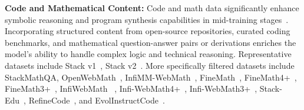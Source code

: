 


\noindent\textbf{Code and Mathematical Content:}
Code and math data significantly enhance symbolic reasoning and program synthesis capabilities in mid-training stages~\cite{gunter2024apple, allal2025smollm2, Zhang2024MAPNeoHC, hu2024minicpm, chen2025minimax, yang2025qwen3, yang2025qwen3}.
Incorporating structured content from open-source repositories, curated coding benchmarks, and mathematical question-answer pairs or derivations enriches the model's ability to handle complex logic and technical reasoning.
Representative datasets include Stack v1~\cite{Kocetkov2022TheStack}, Stack v2~\cite{lozhkov2024starcoder}. More specifically filtered datasets include StackMathQA, OpenWebMath~\cite{paster2023openwebmath}, InfiMM-WebMath~\cite{han2024infimm}, FineMath~\cite{hu2024minicpm}, FineMath4+~\cite{hu2024minicpm}, FineMath3+~\cite{hu2024minicpm}, InfiWebMath~\cite{han2024infimmwebmath40badvancingmultimodalpretraining} , Infi-WebMath4+~\cite{hu2024minicpm}, Infi-WebMath3+~\cite{hu2024minicpm}, Stack-Edu~\cite{allal2025smollm2}, RefineCode~\cite{huang2024opencoder}, and EvolInstructCode~\cite{luo2023wizardcoder}.
